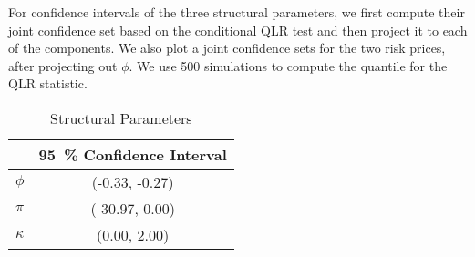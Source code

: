 For confidence intervals of the three structural parameters, we first compute their joint confidence set based on the conditional QLR test and then project it to each of the components. We also plot a joint confidence sets for the two risk prices, after projecting out $\phi$. We use 500 simulations to compute the quantile for the QLR statistic.


\begin{table}[htb]
  \caption{Structural Parameters} 
  \label{tbl:structural_param_estimates}

  \centering

  \begin{tabularx}{.4\textwidth}{X | c } 
%
    \toprule
    & \SI{95}{\percent} Confidence Interval \\
    \midrule
    $\phi$      & (-0.33, -0.27) \\
    \rowcolor{gray!20}
    $\pi$       & (-30.97,  0.00)  \\
    $\kappa$    & (0.00, 2.00) \\
    \bottomrule 
  \end{tabularx}
\end{table}


